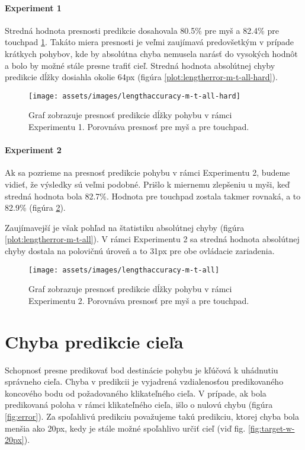 \paragraph{Experiment 1}
Stredná hodnota presnosti predikcie dosahovala 80.5\% pre myš a 82.4\% pre touchpad \ref{plot:lengthaccuracy-m-t-all-hard}. Takáto miera presnosti je veľmi zaujímavá predovšetkým v prípade krátkych pohybov, kde by absolútna chyba nemusela narásť do vysokých hodnôt a bolo by možné stále presne trafiť cieľ. Stredná hodnota absolútnej chyby predikcie dĺžky dosiahla okolie 64px (figúra \ref{plot:lengtherror-m-t-all-hard}).

\begin{figure}[h]
\centering
\texttt{[image: assets/images/lengthaccuracy-m-t-all-hard]}
\caption{Graf zobrazuje presnosť predikcie dĺžky pohybu v rámci Experimentu 1. Porovnáva presnosť pre myš a pre touchpad. \label{plot:lengthaccuracy-m-t-all-hard}}
\end{figure}

\paragraph{Experiment 2}
Ak sa pozrieme na presnosť predikcie pohybu v rámci Experimentu 2, budeme vidieť, že výsledky sú veľmi podobné. Prišlo k miernemu zlepšeniu u myši, keď stredná hodnota bola 82.7\%. Hodnota pre touchpad zostala takmer rovnaká, a to 82.9\% (figúra \ref{plot:lengthaccuracy-m-t-all}).

Zaujímavejší je však pohľad na štatistiku absolútnej chyby (figúra \ref{plot:lengtherror-m-t-all}). V rámci Experimentu 2 sa stredná hodnota absolútnej chyby dostala na polovičnú úroveň a to 31px pre obe ovládacie zariadenia.

\begin{figure}[h]
\centering
\texttt{[image: assets/images/lengthaccuracy-m-t-all]}
\caption{Graf zobrazuje presnosť predikcie dĺžky pohybu v rámci Experimentu 2. Porovnáva presnosť pre myš a pre touchpad. \label{plot:lengthaccuracy-m-t-all}}
\end{figure}

\section{Chyba predikcie cieľa}
Schopnosť presne predikovať bod destinácie pohybu je kľúčová k uhádnutiu správneho cieľa.  Chyba v predikcii je vyjadrená vzdialenosťou predikovaného koncového bodu od požadovaného klikateľného cieľa. V prípade, ak bola predikovaná poloha v rámci klikateľného cieľa, išlo o nulovú chybu (figúra \ref{fig:error}). Za spoľahlivú predikciu považujeme takú predikciu, ktorej chyba bola menšia ako 20px, kedy je stále možné spoľahlivo určiť cieľ (viď fig. \ref{fig:target-w-20px}).


